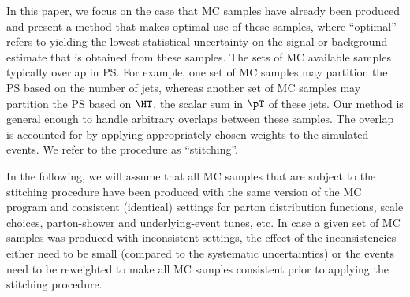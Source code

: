 In this paper, we focus on the case that MC samples have already been produced and present a method that makes optimal use of these samples,
where ``optimal'' refers to yielding the lowest statistical uncertainty on the signal or background estimate that is obtained from these samples.
The sets of MC available samples typically overlap in PS.
For example, one set of MC samples may partition the PS based on the number of jets, 
whereas another set of MC samples may partition the PS based on $\HT$, the scalar sum in $\pT$ of these jets.
Our method is general enough to handle arbitrary overlaps between these samples.
The overlap is accounted for by applying appropriately chosen weights to the simulated events.
We refer to the procedure as ``stitching''.

In the following, we will assume that all MC samples that are subject to the stitching procedure 
have been produced with the same version of the MC program and consistent (\ie identical) settings 
for parton distribution functions, scale choices, parton-shower and underlying-event tunes, etc.
In case a given set of MC samples was produced with inconsistent settings,
the effect of the inconsistencies either need to be small (compared to \eg the systematic uncertainties) or the events need to be reweighted
to make all MC samples consistent prior to applying the stitching procedure.


